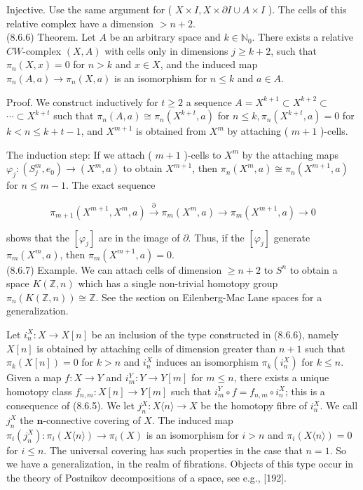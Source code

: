 \documentclass[10pt, letterpaper]{article}
\begin{document}
Injective. Use the same argument for ( $X \times I, X \times \partial I \cup A \times I$ ). The cells of this relative complex have a dimension $>n+2$.\\
(8.6.6) Theorem. Let $A$ be an arbitrary space and $k \in \mathbb{N}_{0}$. There exists a relative $C W$-complex $(X, A)$ with cells only in dimensions $j \geq k+2$, such that $\pi_{n}(X, x)=0$ for $n>k$ and $x \in X$, and the induced map $\pi_{n}(A, a) \rightarrow \pi_{n}(X, a)$ is an isomorphism for $n \leq k$ and $a \in A$.

Proof. We construct inductively for $t \geq 2$ a sequence $A=X^{k+1} \subset X^{k+2} \subset$ $\cdots \subset X^{k+t}$ such that $\pi_{n}(A, a) \cong \pi_{n}\left(X^{k+t}, a\right)$ for $n \leq k, \pi_{n}\left(X^{k+t}, a\right)=0$ for $k<n \leq k+t-1$, and $X^{m+1}$ is obtained from $X^{m}$ by attaching ( $m+1$ )-cells.

The induction step: If we attach ( $m+1$ )-cells to $X^{m}$ by the attaching maps $\varphi_{j}:\left(S_{j}^{m}, e_{0}\right) \rightarrow\left(X^{m}, a\right)$ to obtain $X^{m+1}$, then $\pi_{n}\left(X^{m}, a\right) \cong \pi_{n}\left(X^{m+1}, a\right)$ for $n \leq m-1$. The exact sequence

$$
\pi_{m+1}\left(X^{m+1}, X^{m}, a\right) \xrightarrow{\partial} \pi_{m}\left(X^{m}, a\right) \rightarrow \pi_{m}\left(X^{m+1}, a\right) \rightarrow 0
$$

shows that the $\left[\varphi_{j}\right]$ are in the image of $\partial$. Thus, if the $\left[\varphi_{j}\right]$ generate $\pi_{m}\left(X^{m}, a\right)$, then $\pi_{m}\left(X^{m+1}, a\right)=0$.\\
(8.6.7) Example. We can attach cells of dimension $\geq n+2$ to $S^{n}$ to obtain a space $K(\mathbb{Z}, n)$ which has a single non-trivial homotopy group $\pi_{n}(K(\mathbb{Z}, n)) \cong \mathbb{Z}$. See the section on Eilenberg-Mac Lane spaces for a generalization.

Let $i_{n}^{X}: X \rightarrow X[n]$ be an inclusion of the type constructed in (8.6.6), namely $X[n]$ is obtained by attaching cells of dimension greater than $n+1$ such that $\pi_{k}(X[n])=0$ for $k>n$ and $i_{n}^{X}$ induces an isomorphism $\pi_{k}\left(i_{n}^{X}\right)$ for $k \leq n$. Given a map $f: X \rightarrow Y$ and $i_{m}^{Y}: Y \rightarrow Y[m]$ for $m \leq n$, there exists a unique homotopy class $f_{n, m}: X[n] \rightarrow Y[m]$ such that $i_{m}^{Y} \circ f=f_{n, m} \circ i_{n}^{X}$; this is a consequence of (8.6.5). We let $j_{n}^{X}: X\langle n\rangle \rightarrow X$ be the homotopy fibre of $i_{n}^{X}$. We call $j_{n}^{X}$ the $\boldsymbol{n}$-connective covering of $X$. The induced map $\pi_{i}\left(j_{n}^{X}\right): \pi_{i}(X\langle n\rangle) \rightarrow \pi_{i}(X)$ is an isomorphism for $i>n$ and $\pi_{i}(X\langle n\rangle)=0$ for $i \leq n$. The universal covering has such properties in the case that $n=1$. So we have a generalization, in the realm of fibrations. Objects of this type occur in the theory of Postnikov decompositions of a space, see e.g., [192].
\end{document}
